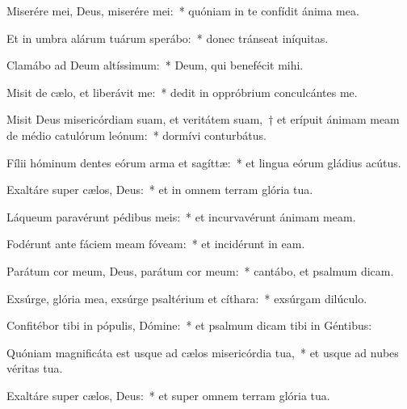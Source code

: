 \item Miserére mei, Deus, miserére mei:~* quóniam in te confídit ánima mea.

\item Et in umbra alárum tuárum sperábo:~* donec tránseat iníquitas.

\item Clamábo ad Deum altíssimum:~* Deum, qui benefécit mihi.

\item Misit de cælo, et liberávit me:~* dedit in oppróbrium conculcántes me.

\item Misit Deus misericórdiam suam, et veritátem suam,~† et erípuit ánimam meam de médio catulórum leónum:~* dormívi conturbátus.

\item Fílii hóminum dentes eórum arma et sagíttæ:~* et lingua eórum gládius acútus.

\item Exaltáre super cælos, Deus:~* et in omnem terram glória tua.

\item Láqueum paravérunt pédibus meis:~* et incurvavérunt ánimam meam.

\item Fodérunt ante fáciem meam fóveam:~* et incidérunt in eam.

\item Parátum cor meum, Deus, parátum cor meum:~* cantábo, et psalmum dicam.

\item Exsúrge, glória mea, exsúrge psaltérium et cíthara:~* exsúrgam dilúculo.

\item Confitébor tibi in pópulis, Dómine:~* et psalmum dicam tibi in Géntibus:

\item Quóniam magnificáta est usque ad cælos misericórdia tua,~* et usque ad nubes véritas tua.

\item Exaltáre super cælos, Deus:~* et super omnem terram glória tua.

